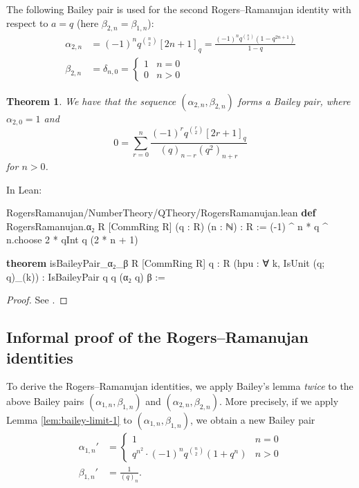 \documentclass[12pt]{amsart}
\newtheorem{theorem}{Theorem}[subsection]
\theoremstyle{definition}
\theoremstyle{remark}
\numberwithin{equation}{subsection}
\newcommand{\kw}[1]{\textcolor{keywordcolor}{\textbf{#1}}}
\newcommand{\var}[1]{\textcolor{tacticcolor}{#1}}
\newcommand{\prop}[1]{\textcolor{sortcolor}{#1}}
\newcommand{\num}[1]{\textcolor{numcolor}{#1}}
\newcommand{\imp}[1]{\textcolor{commentcolor}{\textbraceleft#1\textbraceright}}
\begin{document}
The following Bailey pair is used for the second Rogers--Ramanujan identity with respect to $a = q$ (here $\beta_{2, n} = \beta_{1,n}$):
\begin{align}
    \alpha_{2,n} &= (-1)^n q^{\binom{n}{2}} [2n+1]_q = \frac{(-1)^n q^{\binom{n}{2}}(1 - q^{2n+1})}{1 - q} \\
    \beta_{2,n} &= \delta_{n,0} = \begin{cases}
        1 & n = 0 \\ 0 & n > 0
    \end{cases}
\end{align}
\begin{theorem} 
    \label{thm:RR2-bailey-pair} We have that the sequence
    $(\alpha_{2,n}, \beta_{2,n})$ forms a Bailey pair, where $\alpha_{2,0} = 1$ and 
    \begin{equation}
        0 = \sum_{r=0}^{n} \frac{(-1)^r q^{\binom{r}{2}}[2r+1]_q}{(q)_{n-r}(q^2)_{n+r}}
    \end{equation}
    for $n > 0$.
\end{theorem}

In Lean:

\begin{code}{RogersRamanujan/NumberTheory/QTheory/RogersRamanujan.lean}
\kw{def} RogersRamanujan.α₂ \imp{R} [CommRing \var{R}] (\var{q} : \var{R}) (\var{n} : ℕ) : \var{R} :=
  (-\num{1}) ^ \var{n} * \var{q} ^ \var{n}.\prop{choose} \num{2} * qInt \var{q} (\num{2} * \var{n} + \num{1})

\kw{theorem} isBaileyPair_α₂_β \imp{R} [CommRing \var{R}] \imp{q : R} (\var{hpu} : ∀ \var{k}, IsUnit (\var{q}; \var{q})_(\var{k})) :
  IsBaileyPair \var{q} \var{q} (α₂ \var{q}) β :=
\end{code}
\begin{proof}
    See \cite[Section 3.5]{Andrews1986}.
\end{proof}


\subsection{Informal proof of the Rogers--Ramanujan identities}

To derive the Rogers--Ramanujan identities, we apply Bailey's lemma \emph{twice} to the above Bailey pairs $(\alpha_{1,n}, \beta_{1,n})$ and $(\alpha_{2,n},\beta_{2,n})$.
More precisely, if we apply Lemma \ref{lem:bailey-limit-1} to $(\alpha_{1,n}, \beta_{1, n})$, we obtain a new Bailey pair
\begin{align}
    \alpha_{1,n}' &= \begin{cases}
        1 & n = 0 \\ q^{n^2} \cdot (-1)^n q^{\binom{n}{2}} (1 + q^n) & n > 0
    \end{cases} \\
    \beta_{1,n}' &= \frac{1}{(q)_n}.
\end{align}
\end{document}
